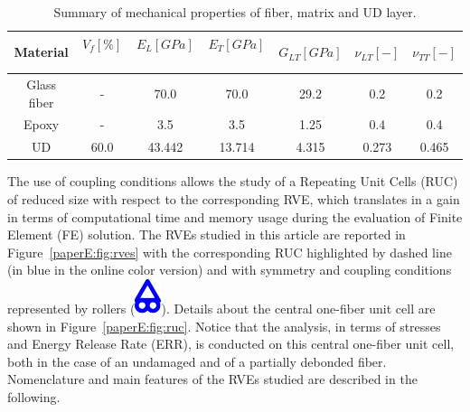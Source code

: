 \begin{table}[!htbp]
 \centering
 \caption{Summary of mechanical properties of fiber, matrix and UD layer.}%
 \begin{tabular}{ccccccc}
\textbf{Material} & \textbf{$V_{f}\left[\%\right]$}\  & \textbf{$E_{L}\left[GPa\right]$}\ & \textbf{$E_{T}\left[GPa\right]$}\  & \textbf{$G_{LT}\left[GPa\right]$} &\textbf{$\nu_{LT}\left[-\right]$} & \textbf{$\nu_{TT}\left[-\right]$} \\
\midrule
Glass fiber &-   & 70.0 & 70.0  & 29.2 & 0.2  & 0.2\\
Epoxy    &-& 3.5 & 3.5   & 1.25 &  0.4& 0.4\\
UD&60.0&43.442&13.714& 4.315& 0.273&0.465\\
\end{tabular}
\label{paperE:tab:phaseprop}
\end{table}

The use of coupling conditions allows the study of a Repeating Unit Cells (RUC) of reduced size with respect to the corresponding RVE, which translates in a gain in terms of computational time and memory usage during the evaluation of Finite Element (FE) solution. The RVEs studied in this article are reported in Figure~\ref{paperE:fig:rves} with the corresponding RUC highlighted by dashed line (in blue in the online color version) and with symmetry and coupling conditions represented by rollers (\includegraphics[scale=0.5]{roller.pdf}). Details about the central one-fiber unit cell are shown in Figure~\ref{paperE:fig:ruc}. Notice that the analysis, in terms of stresses and Energy Release Rate (ERR), is conducted on this central one-fiber unit cell, both in the case of an undamaged and of a partially debonded fiber.\\
Nomenclature and main features of the RVEs studied are described in the following.

